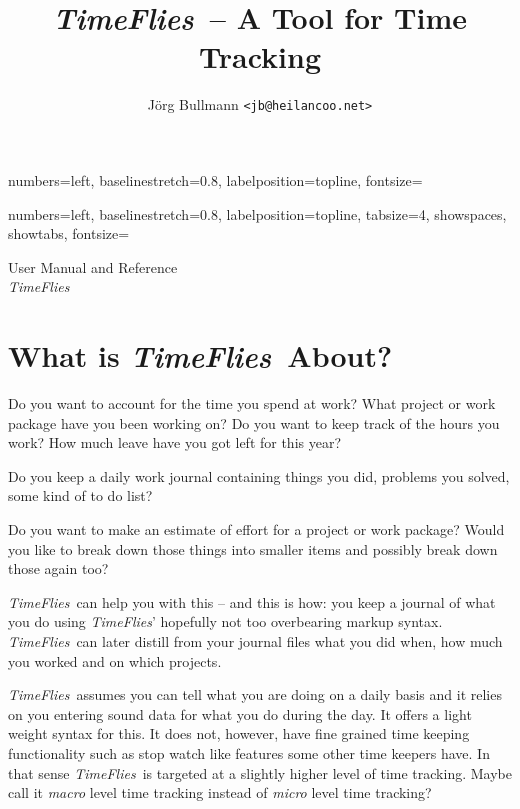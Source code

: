 \documentclass[11pt]{article}
\newcommand{\timeflies}{\emph{TimeFlies}}
\begin{document}
   {numbers=left,
    baselinestretch=0.8,
    labelposition=topline,
    fontsize=\small}

   {numbers=left,
    baselinestretch=0.8,
    labelposition=topline,
    tabsize=4,
    showspaces,
    showtabs,
    fontsize=\small}

\title{\timeflies\ -- A Tool for Time Tracking}
\author{J\"org Bullmann \tt<jb@heilancoo.net>}
\maketitle
\begin{center}
User Manual and Reference\\
\timeflies\ 
\end{center}
\newpage
\tableofcontents
\newpage

\section{What is \timeflies\ About?}

Do you want to account for the time you spend at work? What project or work package have you been working on? Do you want to keep track of the hours you work? How much leave have you got left for this year?

Do you keep a daily work journal containing things you did, problems you solved, some kind of to do list?

Do you want to make an estimate of effort for a project or work package? Would you like to break down those things into smaller items and possibly break down those again too?

\timeflies\ can help you with this -- and this is how: you keep a journal of what you do using \timeflies' hopefully not too overbearing markup syntax. \timeflies\ can later distill from your journal files what you did when, how much you worked and on which projects.

\timeflies\ assumes you can tell what you are doing on a daily basis and it relies on you entering sound data for what you do during the day. It offers a light weight syntax for this. It does not, however, have fine grained time keeping functionality such as stop watch like features some other time keepers have. In that sense \timeflies\ is targeted at a slightly higher level of time tracking. Maybe call it \emph{macro} level time tracking instead of \emph{micro} level time tracking?
\end{document}
